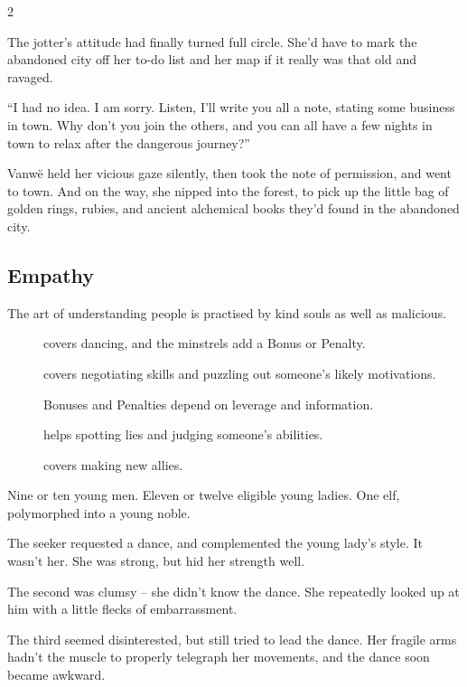 \begin{multicols}{2}
\begin{exampletext}
  The \gls{jotter}'s attitude had finally turned full circle.
  She'd have to mark the abandoned city off her to-do list and her map if it really was that old and ravaged.

  ``I had no idea.
  I am sorry.
  Listen, I'll write you all a note, stating some business in town.
  Why don't you join the others, and you can all have a few nights in town to relax after the dangerous journey?''

  Vanw\"e held her vicious gaze silently, then took the note of permission, and went to town.
  And on the way, she nipped into the forest, to pick up the little bag of golden rings, rubies, and ancient alchemical books they'd found in the abandoned city.

\end{exampletext}

\subsection{Empathy}

The art of understanding people is practised by kind souls as well as malicious.

\begin{description}
  \item[]
    covers dancing, and the minstrels add a Bonus or Penalty.
  \item[]
    covers negotiating skills and puzzling out someone's likely motivations.

    Bonuses and Penalties depend on leverage and information.
  \item[]
    helps spotting lies and judging someone's abilities.
  \item[]
    covers making new allies.
\end{description}

\begin{exampletext}
  Nine or ten young men.
  Eleven or twelve eligible young ladies.
  One elf, polymorphed into a young noble.

  The \gls{seeker} requested a dance, and complemented the young lady's style.
  It wasn't her.
  She was strong, but hid her strength well.

  The second was clumsy -- she didn't know the dance.
  She repeatedly looked up at him with a little flecks of embarrassment.

  The third seemed disinterested, but still tried to lead the dance.
  Her fragile arms hadn't the muscle to properly telegraph her movements, and the dance soon became awkward.


\end{exampletext}
\end{multicols}
